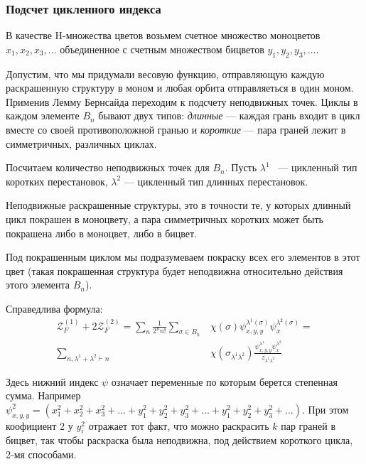 \subsubsection{Подсчет цикленного индекса}
В качестве H-множества цветов возьмем счетное множество моноцветов $x_1, x_2,
x_3, \dots$ объединенное с счетным множеством бицветов $y_1, y_2, y_3, \dots$.

Допустим, что мы придумали весовую функцию, отправляющую каждую раскрашенную
структуру в моном и любая орбита отправляеться в один моном. Применив Лемму
Бернсайда переходим к подсчету неподвижных точек. Циклы в каждом элементе $B_n$
бывают двух типов:
\emph{длинные} --- каждая грань входит в цикл вместе со своей противоположной
гранью и \emph{короткие} --- пара граней лежит в симметричных, различных циклах. 

Посчитаем количество неподвижных точек для $B_n$. Пусть $\lambda^1$~
--- цикленный тип коротких перестановок, $\lambda^2$ --- цикленный тип длинных
перестановок. 
\begin{statement}
Неподвижные раскрашенные структуры, это в точности
те, у которых длинный цикл покрашен в моноцвету, а пара симметричных коротких 
может быть покрашена либо в моноцвет, либо в бицвет. 
\end{statement}
Под покрашенным циклом мы подразумеваем покраску всех его элементов в этот цвет
(такая покрашенная структура будет неподвижна относительно действия этого
элемента $B_n$).

\begin{statement}
Справедлива формула:
\begin{equation}
\label{eq:h-fr1}
\begin{split}
\mathcal Z_F^{(1)} + 2\mathcal Z_F^{(2)} = 
\sum_{n}\frac{1}{2^{n}n!}\sum_{\sigma \in B_n}&\chi(\sigma)
\psi_{x, y, y}^{\lambda^1(\sigma)} \psi_{x}^{\lambda^2(\sigma)} = \\
\sum_{n, \lambda^1 + \lambda^2 \vdash n}&\chi(\sigma_{\lambda^1 \lambda^2})
\frac{\psi_{x, y, y}^{\lambda^1} \psi_{x}^{\lambda^2}}{z_{\lambda^1 \lambda^2}}
\end{split}
\end{equation}
\end{statement}
Здесь нижний индекс $\psi$ означает переменные по которым берется степенная
сумма. Например $\psi_{x, y, y}^2 =  (x_1^2 + x_2^2 + x_3^2 + \dots + y_1^2 +
y_2^2 + y_3^2 + \dots + y_1^2 + y_2^2 + y_3^2 + \dots)$. При этом коофициент
2 у $y_i^2$ отражает тот факт, что можно раскрасить $k$ пар граней в бицвет,
так чтобы раскраска была неподвижна, под действием короткого цикла, 2-мя способами.

